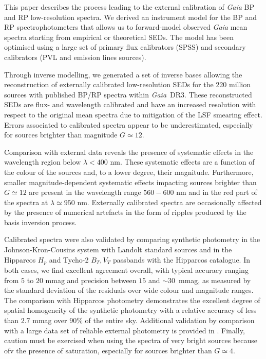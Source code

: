 \documentclass{aa}
\newcommand{\gdr}[1]{\gaia~DR#1\xspace}
\newcommand{\gaia}{\textit{Gaia}\xspace}
\newcommand{\xp}{BP and RP\xspace}
\newcommand{\wrt}{with respect to\xspace}
\begin{document}
This paper describes the process leading to the external calibration of \gaia \xp low-resolution spectra. 
We derived an instrument model for the \xp spectrophotometers  
that allows us to forward-model observed \gaia mean spectra starting from empirical or theoretical SEDs. 
The model has been optimised using a large set of primary flux calibrators (SPSS) and secondary calibrators (PVL and emission lines sources). 

Through inverse modelling, we generated a set of inverse bases allowing the reconstruction of externally calibrated low-resolution SEDs for the 220 million sources with published BP/RP spectra within \gdr 3. These reconstructed SEDs are flux- and wavelength calibrated and have an increased resolution \wrt the original mean spectra 
due to mitigation of the LSF smearing effect. Errors associated to calibrated spectra appear to be underestimated, 
especially for sources brighter than magnitude $G\simeq12$. 

Comparison with external data reveals the presence of systematic effects in the wavelength region below $\lambda<400$ nm. These systematic effects are a function of the colour of the sources and, to a lower degree, their magnitude. Furthermore, smaller magnitude-dependent systematic effects impacting sources brighter than $G\simeq12$ are present in the wavelength range $560-600$ nm and in the red part of the spectra at $\lambda \simeq 950$ nm. Externally calibrated spectra are occasionally affected by the presence of numerical artefacts in the form of ripples 
produced by the basis inversion process. 

Calibrated spectra were also validated by comparing  synthetic photometry in the Johnson-Kron-Cousins system with Landolt standard sources 
and in the Hipparcos $H_p$ and Tycho-2 $B_T,V_T$ passbands with the Hipparcos catalogue. In both cases, we find excellent agreement overall, with typical accuracy ranging from $5$ to $20$ mmag and precision between $15$ and $\sim30$~mmag, as measured by the standard deviation of the residuals over wide colour and magnitude ranges. 
The comparison with Hipparcos photometry demonstrates the excellent degree of spatial homogeneity of the synthetic photometry with a relative accuracy of less than $2.7$ mmag over $90\%$ of the entire sky.
Additional validation by comparison with a large data set of reliable external photometry is provided in \citet{Montegriffo2022}.
Finally, caution must be exercised when using the spectra of very bright sources because ofv the presence of saturation, 
especially for sources brighter than $G\simeq4$.
\end{document}
